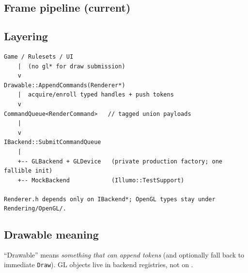 \subsection{Frame pipeline (current)}

\begin{center}
\end{center}

\subsection{Layering}

\begin{lstlisting}[language={}]
Game / Rulesets / UI
    |  (no gl* for draw submission)
    v
Drawable::AppendCommands(Renderer*)
    |  acquire/enroll typed handles + push tokens
    v
CommandQueue<RenderCommand>   // tagged union payloads
    |
    v
IBackend::SubmitCommandQueue
    |
    +-- GLBackend + GLDevice   (private production factory; one fallible init)
    +-- MockBackend            (Illumo::TestSupport)

Renderer.h depends only on IBackend*; OpenGL types stay under Rendering/OpenGL/.
\end{lstlisting}

\subsection{Drawable meaning}
``Drawable'' means \emph{something that can append tokens} (and optionally fall
back to immediate \texttt{Draw}). GL objects live in backend registries, not on
.

